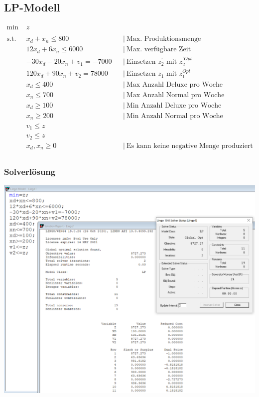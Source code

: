 \documentclass[a4paper,11pt]{article}
\begin{document}
\subsection*{LP-Modell}

\begin{align*}
    \text{min } &z \\~\\
    \text{s.t. } & x_{d} + x_{n} \le 800 && \big|~ \text{Max. Produktionsmenge} \\
    & 12x_{d} + 6x_{n} \le 6000 && \big|~ \text{Max. verfügbare Zeit} \\
    & -30x_{d} -20x_{n} + v_{1} = -7000 && \big|~ \text{Einsetzen $z_{2}^{'}$ mit $z_{2}^{'Opt}$ } \\
    & 120x_{d} + 90x_{n} + v_{2} = 78000 && \big|~ \text{Einsetzen $z_{1}$ mit $z_{1}^{Opt}$ } \\
    & x_{d} \le 400 && \big|~ \text{Max Anzahl Deluxe pro Woche} \\
    & x_{n} \le 700 && \big|~ \text{Max Anzahl Normal pro Woche} \\
    & x_{d} \ge 100 && \big|~ \text{Min Anzahl Deluxe pro Woche} \\
    & x_{n} \ge 200 && \big|~ \text{Min Anzahl Normal pro Woche} \\
    & v_{1} \le z &&  \text{} \\
    & v_{2} \le z && \text{} \\
    & x_{d}, x_{n} \ge 0 && \big|~ \text{Es kann keine negative Menge produziert werden} \\
\end{align*}

\subsubsection*{Solverlösung}

\includegraphics[width=1\linewidth]{src/blatt_7_aufgabe_2_solverloesung_3.png}
\end{document}
